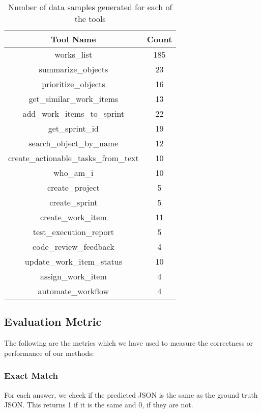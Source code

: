 \documentclass[10pt,twocolumn,letterpaper]{article}
\begin{document}
\begin{table}[htp]
\centering
\begin{tabular}{|c|c|}
\hline
\textbf{Tool Name}                    & \textbf{Count} \\ \hline
works\_list                           & 185            \\ \hline
summarize\_objects                    & 23             \\ \hline
prioritize\_objects                   & 16             \\ \hline
get\_similar\_work\_items             & 13             \\ \hline
add\_work\_items\_to\_sprint          & 22             \\ \hline
get\_sprint\_id                       & 19             \\ \hline
search\_object\_by\_name              & 12             \\ \hline
create\_actionable\_tasks\_from\_text & 10             \\ \hline
who\_am\_i                            & 10             \\ \hline
create\_project                       & 5              \\ \hline
create\_sprint                        & 5              \\ \hline
create\_work\_item                    & 11             \\ \hline
test\_execution\_report               & 5              \\ \hline
code\_review\_feedback                & 4              \\ \hline
update\_work\_item\_status            & 10             \\ \hline
assign\_work\_item                    & 4              \\ \hline
automate\_workflow                    & 4              \\ \hline
\end{tabular}
\caption{Number of data samples generated for each of the tools}
\label{tab:dataset_stats_per_tool}
\end{table}

\subsection{Evaluation Metric}
The following are the metrics which we have used to measure the correctness or performance of our methods:
\subsubsection{Exact Match}
For each answer, we check if the predicted JSON is the same as the ground truth JSON. This returns 1 if it is the same and 0, if they are not. 
\end{document}
